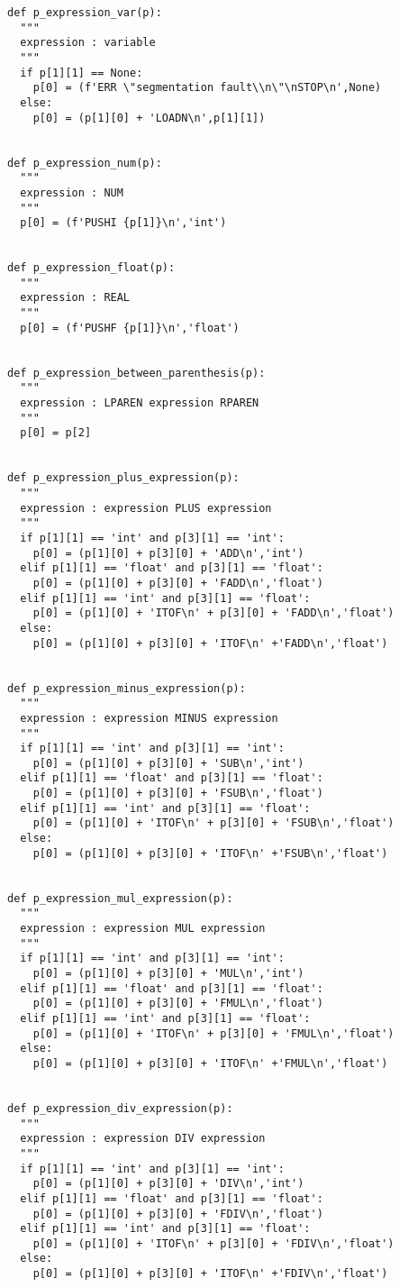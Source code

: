 \documentclass[11pt,a4paper]{report}%
\begin{document}
\begin{scriptsize}
\begin{verbatim}
def p_expression_var(p):
  """
  expression : variable
  """
  if p[1][1] == None:
    p[0] = (f'ERR \"segmentation fault\\n\"\nSTOP\n',None)
  else:
    p[0] = (p[1][0] + 'LOADN\n',p[1][1])


def p_expression_num(p):
  """
  expression : NUM
  """
  p[0] = (f'PUSHI {p[1]}\n','int')


def p_expression_float(p):
  """
  expression : REAL
  """
  p[0] = (f'PUSHF {p[1]}\n','float')


def p_expression_between_parenthesis(p):
  """
  expression : LPAREN expression RPAREN
  """
  p[0] = p[2]


def p_expression_plus_expression(p):
  """
  expression : expression PLUS expression
  """
  if p[1][1] == 'int' and p[3][1] == 'int':
    p[0] = (p[1][0] + p[3][0] + 'ADD\n','int')
  elif p[1][1] == 'float' and p[3][1] == 'float':
    p[0] = (p[1][0] + p[3][0] + 'FADD\n','float')
  elif p[1][1] == 'int' and p[3][1] == 'float':
    p[0] = (p[1][0] + 'ITOF\n' + p[3][0] + 'FADD\n','float')
  else:
    p[0] = (p[1][0] + p[3][0] + 'ITOF\n' +'FADD\n','float')


def p_expression_minus_expression(p):
  """
  expression : expression MINUS expression
  """
  if p[1][1] == 'int' and p[3][1] == 'int':
    p[0] = (p[1][0] + p[3][0] + 'SUB\n','int')
  elif p[1][1] == 'float' and p[3][1] == 'float':
    p[0] = (p[1][0] + p[3][0] + 'FSUB\n','float')
  elif p[1][1] == 'int' and p[3][1] == 'float':
    p[0] = (p[1][0] + 'ITOF\n' + p[3][0] + 'FSUB\n','float')
  else:
    p[0] = (p[1][0] + p[3][0] + 'ITOF\n' +'FSUB\n','float')


def p_expression_mul_expression(p):
  """
  expression : expression MUL expression
  """
  if p[1][1] == 'int' and p[3][1] == 'int':
    p[0] = (p[1][0] + p[3][0] + 'MUL\n','int')
  elif p[1][1] == 'float' and p[3][1] == 'float':
    p[0] = (p[1][0] + p[3][0] + 'FMUL\n','float')
  elif p[1][1] == 'int' and p[3][1] == 'float':
    p[0] = (p[1][0] + 'ITOF\n' + p[3][0] + 'FMUL\n','float')
  else:
    p[0] = (p[1][0] + p[3][0] + 'ITOF\n' +'FMUL\n','float')


def p_expression_div_expression(p):
  """
  expression : expression DIV expression
  """
  if p[1][1] == 'int' and p[3][1] == 'int':
    p[0] = (p[1][0] + p[3][0] + 'DIV\n','int')
  elif p[1][1] == 'float' and p[3][1] == 'float':
    p[0] = (p[1][0] + p[3][0] + 'FDIV\n','float')
  elif p[1][1] == 'int' and p[3][1] == 'float':
    p[0] = (p[1][0] + 'ITOF\n' + p[3][0] + 'FDIV\n','float')
  else:
    p[0] = (p[1][0] + p[3][0] + 'ITOF\n' +'FDIV\n','float')



\end{verbatim}
\end{scriptsize}
\end{document}
